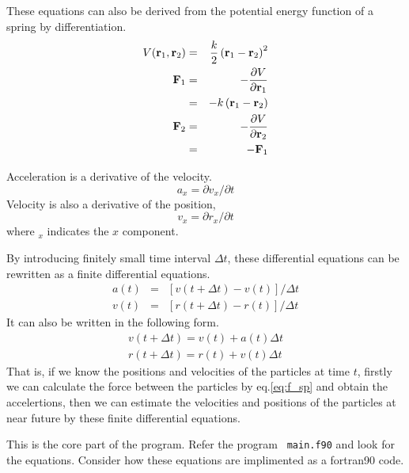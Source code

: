 \documentclass[a4,10pt]{article}
\begin{document}
These equations can also be derived from the potential energy function of a spring by differentiation.
\begin{eqnarray}
V({\bf r}_1, {\bf r}_2) &=& \frac{k}{2}\left({\bf r}_1-{\bf
    r}_2\right)^2\\
{\bf F}_1&=& -\frac{\partial V}{\partial{\bf r}_1}\\
&=&-k\left({\bf r}_1-{\bf r}_2\right)\\
{\bf F}_2&=& -\frac{\partial V}{\partial{\bf r}_2}\\
&=&-{\bf F}_1
\end{eqnarray}

Acceleration is a derivative of the velocity.
\begin{equation}
a_x = \partial v_x / \partial t
\end{equation}
Velocity is also a derivative of the position,
\begin{equation}
v_x = \partial r_x / \partial t
\end{equation}
where $_x$ indicates the $x$ component.

By introducing finitely small time interval $\Delta t$, these
differential equations can be rewritten as a finite differential
equations.
\begin{eqnarray}
a(t)&=&[ v(t+\Delta t) - v(t) ] / \Delta t\\
v(t)&=&[ r(t+\Delta t) - r(t) ] / \Delta t
\end{eqnarray}
It can also be written in the following form.
\begin{eqnarray}
v(t+\Delta t) = v(t) + a(t) \Delta t\\
r(t+\Delta t) = r(t) + v(t) \Delta t
\end{eqnarray}
That is, if we know the positions and velocities of the particles at
time $t$, firstly we can calculate the force between the particles by
eq.\ref{eq:f_sp} and obtain the accelertions, then we can estimate the
velocities and positions of the particles at near future by these
finite differential equations.

This is the core part of the program.  Refer the program {\tt
  main.f90} and look for the equations.  Consider how these equations
are implimented as a fortran90 code.
\end{document}
